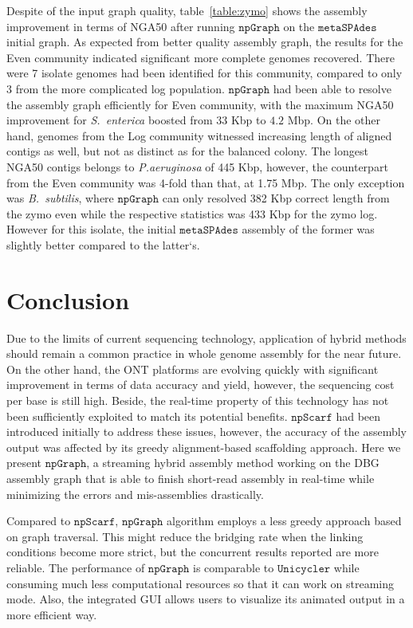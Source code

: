 \documentclass[10pt,twocolumn,twoside]{genpaper}
\newcommand{\npscarf}{$\mathtt{npScarf}$}
\newcommand{\npgraph}{$\mathtt{npGraph}$}
\newcommand{\unicycler}{$\mathtt{Unicycler}$}
\begin{document}
Despite of the input graph quality, table~\ref{table:zymo} shows the assembly improvement in terms of NGA50 after running \npgraph{} on the $\mathtt{metaSPAdes}$ initial graph.  
As expected from better quality assembly graph, the results for the Even community indicated significant more complete genomes recovered. 
There were 7 isolate genomes had been identified for this community, compared to only 3 from the more complicated log population.
\npgraph{} had been able to resolve the assembly graph efficiently for Even community, with the maximum NGA50 improvement for \emph{S.~enterica} boosted from $33$ Kbp to $4.2$ Mbp. 
On the other hand, genomes from the Log community witnessed increasing length of aligned contigs as well, but not as distinct as for the balanced colony. The longest NGA50 contigs belongs to \emph{P.aeruginosa} of 445 Kbp, however, the counterpart from the Even community was 4-fold than that, at 1.75 Mbp.
The only exception was \emph{B.~subtilis}, where \npgraph{} can only resolved 382 Kbp correct length from the zymo even while the respective statistics was 433 Kbp for the zymo log. However for this isolate, the initial $\mathtt{metaSPAdes}$ assembly of the former was slightly better compared to the latter`s.


\section*{Conclusion}
Due to the limits of current sequencing technology, application of hybrid methods should remain a common practice in whole genome assembly for the near future.
On the other hand, the ONT platforms are evolving quickly with significant improvement in terms of data accuracy and yield, however, the sequencing cost per base is still high. Beside, the real-time property of this technology has not been sufficiently exploited to match its potential benefits.
\npscarf{} had been introduced initially to address these issues, however, the accuracy of the assembly output was affected by its greedy alignment-based scaffolding approach.
Here we present \npgraph{}, a streaming hybrid assembly method working on the DBG assembly graph that is able to finish short-read assembly in real-time while minimizing the errors and mis-assemblies drastically.

Compared to \npscarf, \npgraph{} algorithm employs a less greedy approach based on graph traversal. This might reduce the bridging rate when the linking conditions become more strict, but the concurrent results reported are more reliable.
The performance of \npgraph{} is comparable to \unicycler{} while consuming much less computational resources so that it can work on streaming mode. 
Also, the integrated GUI allows users to visualize its animated output in a  more efficient way.
\end{document}
